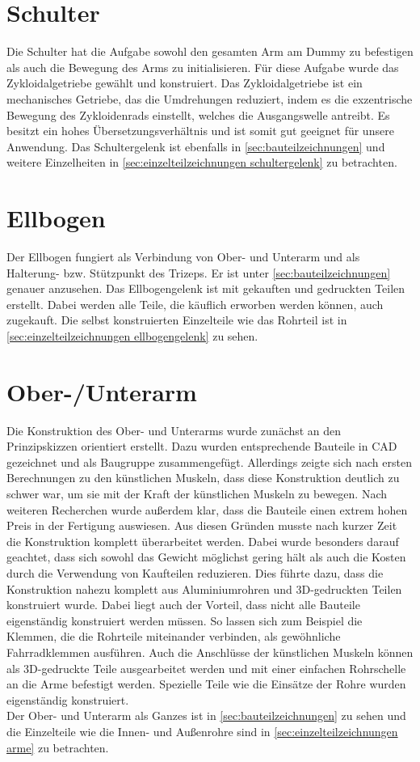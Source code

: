 	\section{Schulter}
		Die Schulter hat die Aufgabe sowohl den gesamten Arm am Dummy zu befestigen als auch die Bewegung des Arms zu initialisieren.
		Für diese Aufgabe wurde das Zykloidalgetriebe gewählt und konstruiert.
		Das Zykloidalgetriebe ist ein mechanisches Getriebe, das die Umdrehungen reduziert, indem es die exzentrische Bewegung des Zykloidenrads einstellt, welches die Ausgangswelle antreibt. Es besitzt ein hohes Übersetzungsverhältnis und ist somit gut geeignet für unsere Anwendung.
		Das Schultergelenk ist ebenfalls in \cref{sec:bauteilzeichnungen} und weitere Einzelheiten in \cref{sec:einzelteilzeichnungen schultergelenk} zu betrachten.
	
	\section{Ellbogen}
		Der Ellbogen fungiert als Verbindung von Ober- und Unterarm und als Halterung- bzw. Stützpunkt des Trizeps.
		Er ist unter \cref{sec:bauteilzeichnungen} genauer anzusehen.
		Das Ellbogengelenk ist mit gekauften und gedruckten Teilen erstellt.
		Dabei werden alle Teile, die käuflich erworben werden können, auch zugekauft.
		Die selbst konstruierten Einzelteile wie das Rohrteil ist in \cref{sec:einzelteilzeichnungen ellbogengelenk} zu sehen.
	
	\section{Ober-/Unterarm}
		Die Konstruktion des Ober- und Unterarms wurde zunächst an den Prinzipskizzen orientiert erstellt.
		Dazu wurden entsprechende Bauteile in CAD gezeichnet und als Baugruppe zusammengefügt.
		Allerdings zeigte sich nach ersten Berechnungen zu den künstlichen Muskeln, dass diese Konstruktion deutlich zu schwer war, um sie mit der Kraft der künstlichen Muskeln zu bewegen.
		Nach weiteren Recherchen wurde außerdem klar, dass die Bauteile einen extrem hohen Preis in der Fertigung auswiesen.
		Aus diesen Gründen musste nach kurzer Zeit die Konstruktion komplett überarbeitet werden.
		Dabei wurde besonders darauf geachtet, dass sich sowohl das Gewicht möglichst gering hält als auch die Kosten durch die Verwendung von Kaufteilen reduzieren.
		Dies führte dazu, dass die Konstruktion nahezu komplett aus Aluminiumrohren und 3D-gedruckten Teilen konstruiert wurde.
		Dabei liegt auch der Vorteil, dass nicht alle Bauteile eigenständig konstruiert werden müssen.
		So lassen sich zum Beispiel die Klemmen, die die Rohrteile miteinander verbinden, als gewöhnliche Fahrradklemmen ausführen.
		Auch die Anschlüsse der künstlichen Muskeln können als 3D-gedruckte Teile ausgearbeitet werden und mit einer einfachen Rohrschelle an die Arme befestigt werden.
		Spezielle Teile wie die Einsätze der Rohre wurden eigenständig konstruiert.\\
		Der Ober- und Unterarm als Ganzes ist in \cref{sec:bauteilzeichnungen} zu sehen und die Einzelteile wie die Innen- und Außenrohre sind in \cref{sec:einzelteilzeichnungen arme} zu betrachten.
	
